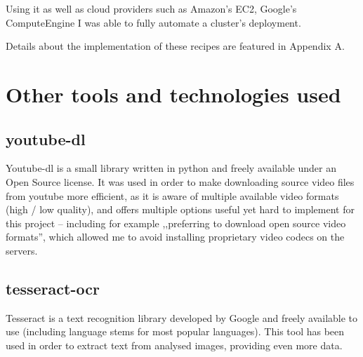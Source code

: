 Using it as well as cloud providers such as Amazon's EC2, Google's ComputeEngine I was able to fully automate a cluster's deployment.


Details about the implementation of these recipes are featured in Appendix A.


\section{Other tools and technologies used}
\label{sec:other tools}

\subsection{youtube-dl}
Youtube-dl is a small library written in python and freely available under an Open Source license. 
It was used in order to make downloading source video files from youtube more efficient, as it is aware of multiple available video formats (high / low quality), and offers multiple options useful yet hard to implement for this project -- including for example ,,preferring to download open source video formats'', which allowed me to avoid installing proprietary video codecs on the servers.

\subsection{tesseract-ocr}

Tesseract \cite{tesseract} is a text recognition library developed by Google and freely available to use (including language stems for most popular languages).
This tool has been used in order to extract text from analysed images, providing even more data.

